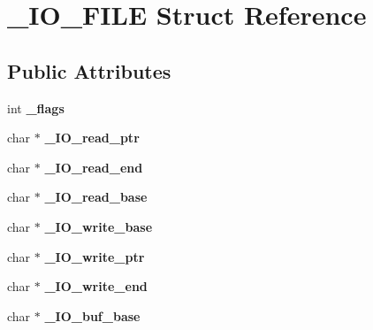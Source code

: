 \hypertarget{struct__IO__FILE}{\section{\+\_\+\+I\+O\+\_\+\+F\+I\+L\+E Struct Reference}
\label{struct__IO__FILE}
}
\subsection*{Public Attributes}
\begin{DoxyCompactItemize}
\item 
\hypertarget{struct__IO__FILE_a364ce3577f2cdb788df3a2a54909f45a}{int {\bfseries \+\_\+flags}}\label{struct__IO__FILE_a364ce3577f2cdb788df3a2a54909f45a}

\item 
\hypertarget{struct__IO__FILE_a6819964338541c553190173a032f6377}{char $\ast$ {\bfseries \+\_\+\+I\+O\+\_\+read\+\_\+ptr}}\label{struct__IO__FILE_a6819964338541c553190173a032f6377}

\item 
\hypertarget{struct__IO__FILE_a29876576674be9d5fa3b16b6b9bbf3b6}{char $\ast$ {\bfseries \+\_\+\+I\+O\+\_\+read\+\_\+end}}\label{struct__IO__FILE_a29876576674be9d5fa3b16b6b9bbf3b6}

\item 
\hypertarget{struct__IO__FILE_a44aa72c0e0a4df1b7deea4d52b754ced}{char $\ast$ {\bfseries \+\_\+\+I\+O\+\_\+read\+\_\+base}}\label{struct__IO__FILE_a44aa72c0e0a4df1b7deea4d52b754ced}

\item 
\hypertarget{struct__IO__FILE_a7a3aade07e501c4a70d2363c913bec02}{char $\ast$ {\bfseries \+\_\+\+I\+O\+\_\+write\+\_\+base}}\label{struct__IO__FILE_a7a3aade07e501c4a70d2363c913bec02}

\item 
\hypertarget{struct__IO__FILE_a82d50243e5ab96d9210c46aeced93307}{char $\ast$ {\bfseries \+\_\+\+I\+O\+\_\+write\+\_\+ptr}}\label{struct__IO__FILE_a82d50243e5ab96d9210c46aeced93307}

\item 
\hypertarget{struct__IO__FILE_a923e01ed804041c82aab8366e3df30c9}{char $\ast$ {\bfseries \+\_\+\+I\+O\+\_\+write\+\_\+end}}\label{struct__IO__FILE_a923e01ed804041c82aab8366e3df30c9}

\item 
\hypertarget{struct__IO__FILE_ae20a9ea0852c3a9cab61384f4aafc883}{char $\ast$ {\bfseries \+\_\+\+I\+O\+\_\+buf\+\_\+base}}\label{struct__IO__FILE_ae20a9ea0852c3a9cab61384f4aafc883}


\end{DoxyCompactItemize}
